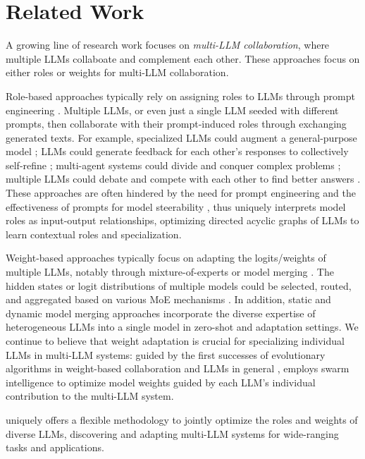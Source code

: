 \section{Related Work}
A growing line of research work focuses on \emph{multi-LLM collaboration}, where multiple LLMs collaboate and complement each other. These approaches focus on either roles or weights for multi-LLM collaboration.

Role-based approaches typically rely on assigning roles to LLMs through prompt engineering \citep{duimproving, feng-etal-2024-dont}. Multiple LLMs, or even just a single LLM seeded with different prompts, then collaborate with their prompt-induced roles through exchanging generated texts. For example, specialized LLMs could augment a general-purpose model \citep{fengknowledge, shen-etal-2024-learning}; LLMs could generate feedback for each other's responses to collectively self-refine \citep{feng-etal-2024-dont, burnsweak}; multi-agent systems could divide and conquer complex problems \citep{wu2024autogen, guo2024large}; multiple LLMs could debate and compete with each other to find better answers  \citep{liang2023encouraging, duimproving}. These approaches are often hindered by the need for prompt engineering and the effectiveness of prompts for model steerability \citep{sprague2024cot, sclarquantifying}, thus \ourmethod{} uniquely interprets model roles as input-output relationships, optimizing directed acyclic graphs of LLMs to learn contextual roles and specialization.

Weight-based approaches typically focus on adapting the logits/weights of multiple LLMs, notably through mixture-of-experts or model merging \citep{yadav2024survey}. The hidden states or logit distributions of multiple models could be selected, routed, and aggregated based on various MoE mechanisms \citep{li2022branch, gritsch2024nexus}. In addition, static \citep{yu2024languagedare, yadav2024ties, jang2024model} and dynamic \citep{mavromatis2024pack, akiba2024evolutionary, huang2023lorahub} model merging approaches incorporate the diverse expertise of heterogeneous LLMs into a single model in zero-shot and adaptation settings. We continue to believe that weight adaptation is crucial for specializing individual LLMs in multi-LLM systems: guided by the first successes of evolutionary algorithms in weight-based collaboration \citep{feng2024model} and LLMs in general \citep{akiba2024evolutionary, fernandopromptbreeder, guoconnecting}, \ourmethod{} employs swarm intelligence to optimize model weights guided by each LLM's individual contribution to the multi-LLM system.

\ourmethod{} uniquely offers a flexible methodology to jointly optimize the roles and weights of diverse LLMs, discovering and adapting multi-LLM systems for wide-ranging tasks and applications.

\vspace*{-5pt}